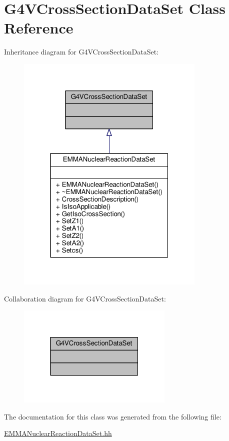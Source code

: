 \hypertarget{classG4VCrossSectionDataSet}{}\section{G4\+V\+Cross\+Section\+Data\+Set Class Reference}
\label{classG4VCrossSectionDataSet}


Inheritance diagram for G4\+V\+Cross\+Section\+Data\+Set\+:
\nopagebreak
\begin{figure}[H]
\begin{center}
\leavevmode
\includegraphics[width=256pt]{classG4VCrossSectionDataSet__inherit__graph}
\end{center}
\end{figure}


Collaboration diagram for G4\+V\+Cross\+Section\+Data\+Set\+:
\nopagebreak
\begin{figure}[H]
\begin{center}
\leavevmode
\includegraphics[width=211pt]{classG4VCrossSectionDataSet__coll__graph}
\end{center}
\end{figure}


The documentation for this class was generated from the following file\+:\begin{DoxyCompactItemize}
\item 
\hyperlink{EMMANuclearReactionDataSet_8hh}{E\+M\+M\+A\+Nuclear\+Reaction\+Data\+Set.\+hh}\end{DoxyCompactItemize}
